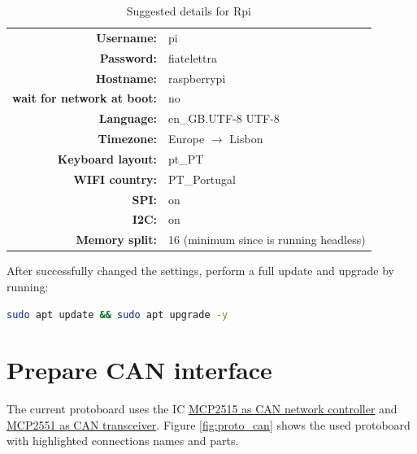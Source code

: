 \begin{table}[h]
	\centering
	\begin{tabular}{rl}
		\toprule
		\textbf{Username:}& pi\\
		\textbf{Password:}& fiatelettra\\
		\textbf{Hostname:}& raspberrypi\\
		\textbf{wait for network at boot:}& no\\
		\textbf{Language:}& en\_GB.UTF-8 UTF-8\\
	    \textbf{Timezone:}& Europe $\rightarrow$ Lisbon\\
	    \textbf{Keyboard layout:}& pt\_PT\\
	    \textbf{WIFI country:}& PT\_Portugal\\
	    \textbf{SPI:}& on\\	
		\textbf{I2C:}& on\\
		\textbf{Memory split:}& 16 (minimum since is running headless)\\
		\bottomrule
	\end{tabular}
	\caption{Suggested details for \gls{Rpi}}
	\label{tab:suggested_config}
\end{table}

After successfully changed the settings, perform a full update and upgrade by running:
\begin{lstlisting}[frame=none,language=bash,backgroundcolor=\color{gray!15},numbers=none]
sudo apt update && sudo apt upgrade -y
\end{lstlisting}


\section{Prepare CAN interface}
\label{section:can}
The current protoboard uses the \gls{IC} \href{https://www.microchip.com/wwwproducts/en/MCP2515}{MCP2515 as CAN network controller} and \href{https://www.microchip.com/wwwproducts/en/MCP2551}{MCP2551 as CAN transceiver}. Figure \ref{fig:proto_can} shows the used protoboard with highlighted connections names and parts.

